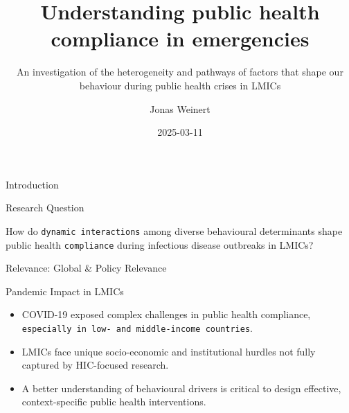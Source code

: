 \documentclass[
  ignorenonframetext,
]{beamer}
\title{Understanding public health compliance in emergencies}
\subtitle{An investigation of the heterogeneity and pathways of factors
that shape our behaviour during public health crises in LMICs}
\author{Jonas Weinert}
\date{2025-03-11}
\providecommand{\tightlist}{%
  \setlength{\itemsep}{0pt}\setlength{\parskip}{0pt}}\usepackage{longtable,booktabs,array}
\begin{document}
\frame{\titlepage}


\begin{frame}{Introduction}
\label{introduction}
\end{frame}

\begin{frame}
\begin{block}{Research Question}
\label{research-question}
\end{block}
\end{frame}

\begin{frame}[fragile]
\begin{block}{How do \texttt{dynamic\ interactions} among diverse
behavioural determinants shape public health \texttt{compliance} during
infectious disease outbreaks in LMICs?}
\label{how-do-dynamic-interactions-among-diverse-behavioural-determinants-shape-public-health-compliance-during-infectious-disease-outbreaks-in-lmics}
\end{block}
\end{frame}

\begin{frame}[fragile]
\begin{block}{Relevance: Global \& Policy Relevance}
\label{relevance-global-policy-relevance}
\begin{block}{Pandemic Impact in LMICs}
\label{pandemic-impact-in-lmics}
\begin{itemize}
\tightlist
\item
  COVID-19 exposed complex challenges in public health compliance,
  \texttt{especially\ in\ low-\ and\ middle-income\ countries}.
\item
  LMICs face unique socio-economic and institutional hurdles not fully
  captured by HIC-focused research.
\item
  A better understanding of behavioural drivers is critical to design
  effective, context-specific public health interventions.
\end{itemize}
\end{block}
\end{block}
\end{frame}
\end{document}
